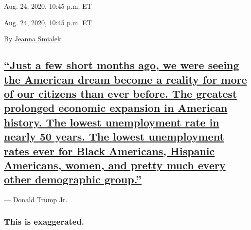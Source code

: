 Aug. 24, 2020, 10:45 p.m. ET

Aug. 24, 2020, 10:45 p.m. ET

By \href{https://www.nytimes3xbfgragh.onion/by/jeanna-smialek}{Jeanna
Smialek}

\hypertarget{just-a-few-short-months-ago-we-were-seeing-the-american-dream-become-a-reality-for-more-of-our-citizens-than-ever-before-the-greatest-prolonged-economic-expansion-in-american-history-the-lowest-unemployment-rate-in-nearly-50-years-the-lowest-unemployment-rates-ever-for-black-americans-hispanic-americans-women-and-pretty-much-every-other-demographic-group}{%
\subsection{\texorpdfstring{\protect\hyperlink{just-a-few-short-months-ago-we-were-seeing-the-american-dream-become-a-reality-for-more-of-our-citizens-than-ever-before-the-gre}{``Just
a few short months ago, we were seeing the American dream become a
reality for more of our citizens than ever before. The greatest
prolonged economic expansion in American history. The lowest
unemployment rate in nearly 50 years. The lowest unemployment rates ever
for Black Americans, Hispanic Americans, women, and pretty much every
other demographic
group.''}}{``Just a few short months ago, we were seeing the American dream become a reality for more of our citizens than ever before. The greatest prolonged economic expansion in American history. The lowest unemployment rate in nearly 50 years. The lowest unemployment rates ever for Black Americans, Hispanic Americans, women, and pretty much every other demographic group.''}}\label{just-a-few-short-months-ago-we-were-seeing-the-american-dream-become-a-reality-for-more-of-our-citizens-than-ever-before-the-greatest-prolonged-economic-expansion-in-american-history-the-lowest-unemployment-rate-in-nearly-50-years-the-lowest-unemployment-rates-ever-for-black-americans-hispanic-americans-women-and-pretty-much-every-other-demographic-group}}

--- Donald Trump Jr.

\hypertarget{this-is-exaggerated-1}{%
\subsubsection{This is exaggerated.}\label{this-is-exaggerated-1}}

